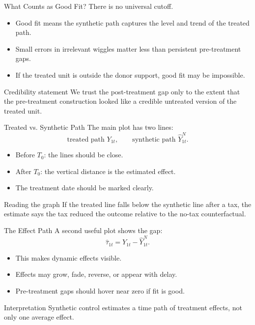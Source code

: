 \documentclass[11pt,aspectratio=169]{beamer}
\begin{document}
\begin{frame}{What Counts as Good Fit?}
  There is no universal cutoff.
  \begin{itemize}
    \item Good fit means the synthetic path captures the level and trend of the treated path.
    \item Small errors in irrelevant wiggles matter less than persistent pre-treatment gaps.
    \item If the treated unit is outside the donor support, good fit may be impossible.
  \end{itemize}
  \begin{block}{Credibility statement}
    We trust the post-treatment gap only to the extent that the pre-treatment construction looked like a credible untreated version of the treated unit.
  \end{block}
\end{frame}

\begin{frame}{Treated vs. Synthetic Path}
  The main plot has two lines:
  \[
    \text{treated path } Y_{1t},
    \qquad
    \text{synthetic path } \widehat{Y}^N_{1t}.
  \]
  \begin{itemize}
    \item Before \(T_0\): the lines should be close.
    \item After \(T_0\): the vertical distance is the estimated effect.
    \item The treatment date should be marked clearly.
  \end{itemize}
  \begin{block}{Reading the graph}
    If the treated line falls below the synthetic line after a tax, the estimate says the tax reduced the outcome relative to the no-tax counterfactual.
  \end{block}
\end{frame}

\begin{frame}{The Effect Path}
  A second useful plot shows the gap:
  \[
    \widehat{\tau}_{1t}
    =
    Y_{1t}-\widehat{Y}^N_{1t}.
  \]
  \begin{itemize}
    \item This makes dynamic effects visible.
    \item Effects may grow, fade, reverse, or appear with delay.
    \item Pre-treatment gaps should hover near zero if fit is good.
  \end{itemize}
  \begin{block}{Interpretation}
    Synthetic control estimates a time path of treatment effects, not only one average effect.
  \end{block}
\end{frame}
\end{document}
